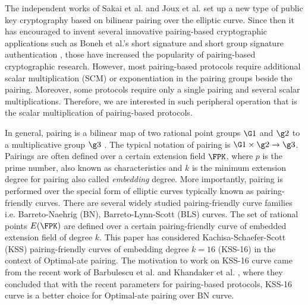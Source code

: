 The independent works of  Sakai et al. \cite{sakai2000cryptosystems} and Joux et al. \cite{joux} set up a new type of public key cryptography based on bilinear pairing over the elliptic curve.
Since then it has encouraged to invent several innovative pairing-based cryptographic applications such as Boneh et al.'s short signature \cite{shortsign} and short group signature authentication \cite{group_sign_1}, those have increased the popularity of pairing-based cryptographic research.
However, most pairing-based protocols require additional scalar multiplication (SCM) or exponentiation in the pairing groups beside the pairing.
Moreover, some protocols \cite{groth2010short} require only a single pairing and several scalar multiplications. 
Therefore, we are interested in such peripheral operation that is the scalar multiplication of pairing-based protocols.

In general, pairing is a bilinear map of two rational point groups $\G1$ and $\g2$ to a multiplicative group $\g3$ \cite{Silverman}.
The typical notation of pairing is $\G1 \times \g2 \rightarrow \g3$.
Pairings are often defined over a certain extension field $\FPK$, where $p$ is the prime number, also known as characteristics  and $k$  is the minimum extension degree for pairing also called \textit{embedding} degree. 
More importantly, pairing is performed over the special form of elliptic curves typically known as pairing-friendly curves.
There are several widely studied pairing-friendly curve families i.e. Barreto-Naehrig (BN), Barreto-Lynn-Scott (BLS) curves\cite{taxonomy}. 
The set of rational points $E(\FPK)$ are defined over a certain pairing-friendly curve of embedded extension field of degree $k$.
This paper has considered Kachisa-Schaefer-Scott (KSS) \cite{kss} pairing-friendly curves of embedding degree $k=16$ (KSS-16) in the context of Optimal-ate pairing.
The motivation to work on KSS-16 curve came from the recent work of Barbulescu et al. \cite{sylvain_new_param} and Khandaker et al. \cite{self_indo17}, where they concluded that with the recent parameters for pairing-based protocols, KSS-16 curve is a better choice for Optimal-ate pairing over BN curve.

